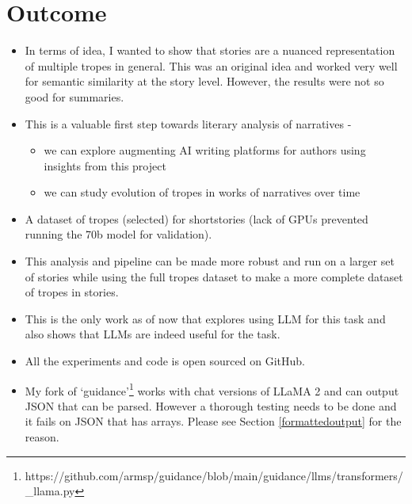 \documentclass[11pt]{article}
\begin{document}
\section{Outcome}
\begin{itemize}
  \item In terms of idea, I wanted to show that stories are a nuanced representation of multiple tropes in general. This was an original idea and worked very well for semantic similarity at the story level. However, the results were not so good for summaries.
  \item This is a valuable first step towards literary analysis of narratives -
  \begin{itemize}
    \item we can explore augmenting AI writing platforms for authors using insights from this project
    \item we can study evolution of tropes in works of narratives over time
  \end{itemize}
  \item A dataset of tropes (selected) for shortstories (lack of GPUs prevented running the 70b model for validation). 
  \item This analysis and pipeline can be made more robust and run on a larger set of stories while using the full tropes dataset to make a more complete dataset of tropes in stories.
  \item This is the only work as of now that explores using LLM for this task and also shows that LLMs are indeed useful for the task. 
  \item All the experiments and code is open sourced on GitHub.
  \item My fork of `guidance'\footnote[2]{https://github.com/armsp/guidance/blob/main/guidance/llms/transformers/\_llama.py}\label{fork} works with chat versions of LLaMA 2 and can output JSON that can be parsed. However a thorough testing needs to be done and it fails on JSON that has arrays. Please see Section \ref{formattedoutput} for the reason.

\end{itemize}
\end{document}
